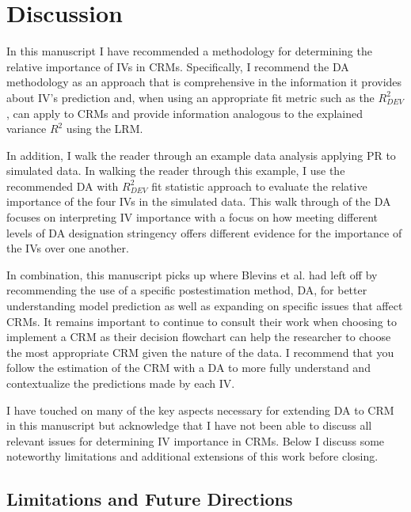 \documentclass[doc]{apa7}
\begin{document}
\section{Discussion}

	In this manuscript I have recommended a methodology for determining the relative importance of IVs in CRMs.
	Specifically, I recommend the DA methodology as an approach that is comprehensive in the information it provides about IV's prediction and, when using an appropriate fit metric such as the $R^2_{DEV}$, can apply to CRMs and provide information analogous to the explained variance $R^2$ using the LRM.
	
	In addition, I walk the reader through an example data analysis applying PR to simulated data. 
	In walking the reader through this example, I use the recommended DA with $R^2_{DEV}$ fit statistic approach to evaluate the relative importance of the four IVs in the simulated data.
	This walk through of the DA focuses on interpreting IV importance with a focus on how meeting different levels of DA designation stringency offers different evidence for the importance of the IVs over one another.
	
	In combination, this manuscript picks up where Blevins et al. \parencite*{blevins2015count} had left off by recommending the use of a specific postestimation method, DA, for better understanding model prediction as well as expanding on specific issues that affect CRMs.
	It remains important to continue to consult their work when choosing to implement a CRM as their decision flowchart can help the researcher to choose the most appropriate CRM given the nature of the data.
	I recommend that you follow the estimation of the CRM with a DA to more fully understand and contextualize the predictions made by each IV.
	
	I have touched on many of the key aspects necessary for extending DA to CRM in this manuscript but acknowledge that I have not been able to discuss all relevant issues for determining IV importance in CRMs.
	Below I discuss some noteworthy limitations and additional extensions of this work before closing.
	
	\subsection{Limitations and Future Directions}
	
\end{document}
